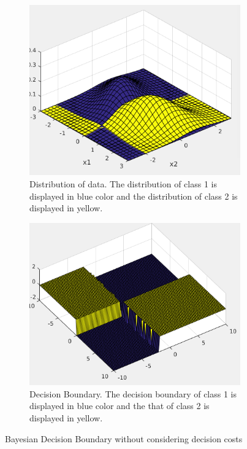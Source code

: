 \documentclass[12pt]{article}
\begin{document}
\begin{enumerate}
\begin{figure}[h]
\centering
\begin{subfigure}{0.35\textwidth}
\includegraphics[scale=0.3]{Imgs/hw1-1-1.png}
\caption{Distribution of data. The distribution of class 1 is displayed in blue color and the distribution of class 2 is displayed in yellow.}
\end{subfigure}
\begin{subfigure}{0.35\textwidth}
\includegraphics[scale=0.3]{Imgs/hw1-1-2.png}
\caption{Decision Boundary. The decision boundary of class 1 is displayed in blue color and the that of class 2 is displayed in yellow.}
\end{subfigure}
\caption{Bayesian Decision Boundary without considering decision costs}
\label{fig:1}
\end{figure}


\end{enumerate}
\end{document}
